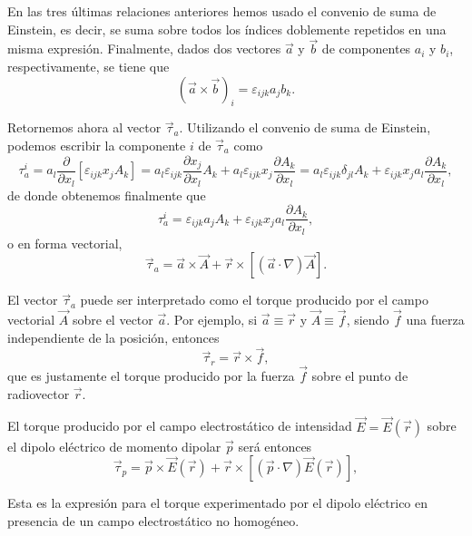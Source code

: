 \documentclass[12pt,a4paper]{book}
\begin{document}
En las tres últimas relaciones anteriores hemos usado el convenio de suma de Einstein, es decir, se suma sobre todos los índices doblemente repetidos en una misma expresión. Finalmente, dados dos vectores $\vec{a}$ y $\vec{b}$ de componentes $a_i$ y $b_i$, respectivamente, se tiene que
\begin{equation}
(\vec{a} \times \vec{b})_i = \varepsilon_{ijk}a_jb_k.
\end{equation}

Retornemos ahora al vector $\vec{\tau}_a$. Utilizando el convenio de suma de Einstein, podemos escribir la componente $i$ de $\vec{\tau}_a$ como
\begin{equation}
\tau_a^i = a_l \frac{\partial}{\partial x_l}[\varepsilon_{ijk}x_jA_k] = a_l\varepsilon_{ijk}\frac{\partial x_j}{\partial x_l}A_k + a_l\varepsilon_{ijk}x_j\frac{\partial A_k}{\partial x_l} = a_l\varepsilon_{ijk}\delta_{jl}A_k + \varepsilon_{ijk}x_ja_l\frac{\partial A_k}{\partial x_l},
\end{equation}
de donde obtenemos finalmente que
\begin{equation}
\tau_a^i = \varepsilon_{ijk}a_jA_k + \varepsilon_{ijk}x_ja_l\frac{\partial A_k}{\partial x_l},
\end{equation}
o en forma vectorial,
\begin{equation}
\vec{\tau}_a = \vec{a} \times \vec{A} + \vec{r} \times [(\vec{a} \cdot \nabla)\vec{A}].
\end{equation}

El vector $\vec{\tau}_a$ puede ser interpretado como el torque producido por el campo vectorial $\vec{A}$ sobre el vector $\vec{a}$. Por ejemplo, si $\vec{a} \equiv \vec{r}$ y $\vec{A} \equiv \vec{f}$, siendo $\vec{f}$ una fuerza independiente de la posición, entonces
\begin{equation}
\vec{\tau}_r = \vec{r} \times \vec{f},
\end{equation}
que es justamente el torque producido por la fuerza $\vec{f}$ sobre el punto de radiovector $\vec{r}$.

El torque producido por el campo electrostático de intensidad $\vec{E} = \vec{E}(\vec{r})$ sobre el dipolo eléctrico de momento dipolar $\vec{p}$ será entonces
\begin{equation}
\vec{\tau}_p = \vec{p} \times \vec{E}(\vec{r}) + \vec{r} \times [(\vec{p} \cdot \nabla)\vec{E}(\vec{r})],
\end{equation}

Esta es la expresión para el torque experimentado por el dipolo eléctrico en presencia de un campo electrostático no homogéneo.
\end{document}
